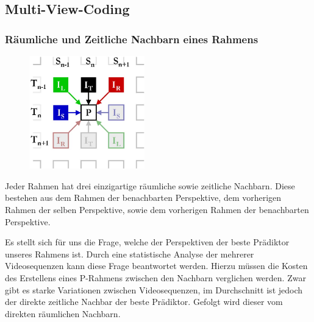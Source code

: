 \subsection{Multi-View-Coding}\label{subsec:mvc}

\subsubsection{R\"aumliche und Zeitliche Nachbarn eines Rahmens}
\begin{figure}
    \includegraphics[width=5cm]{../img/prediction}
\end{figure}

Jeder Rahmen hat drei einzigartige r\"aumliche sowie zeitliche Nachbarn.\cite{paper}
Diese bestehen aus dem Rahmen der benachbarten Perspektive, dem vorherigen Rahmen der selben Perspektive, sowie
dem vorherigen Rahmen der benachbarten Perspektive.

\noindent\newline Es stellt sich f\"ur uns die Frage, welche der Perspektiven der beste Pr\"adiktor unseres Rahmens ist.
Durch eine statistische Analyse der mehrerer Videosequenzen kann diese Frage beantwortet werden.
Hierzu m\"ussen die Kosten des Erstellens eines P-Rahmens zwischen den Nachbarn verglichen werden.
Zwar gibt es starke Variationen zwischen Videosequenzen, im Durchschnitt ist jedoch der direkte zeitliche Nachbar
der beste Pr\"adiktor.\cite{paper}
Gefolgt wird dieser vom direkten r\"aumlichen Nachbarn.
